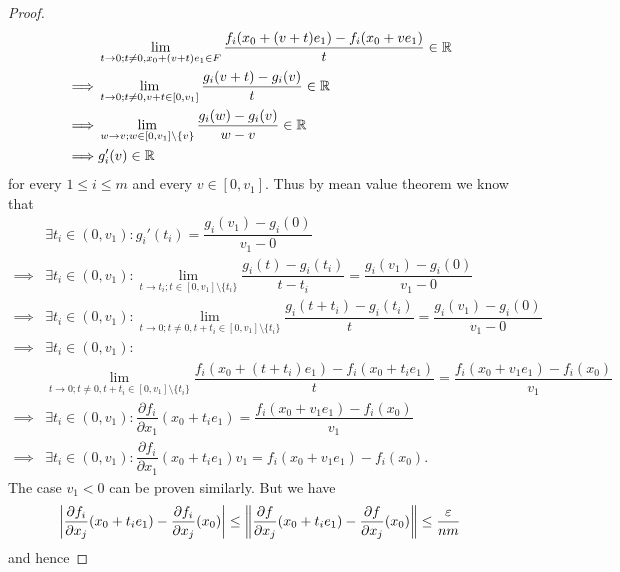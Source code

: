 \begin{proof}
\begin{align*}
             & \lim_{t \to 0 ; t \neq 0, x_0 + (v + t) e_1 \in F} \dfrac{f_i(x_0 + (v + t) e_1) - f_i(x_0 + v e_1)}{t} \in \R \\
    \implies & \lim_{t \to 0 ; t \neq 0, v + t \in [0, v_1]} \dfrac{g_i(v + t) - g_i(v)}{t} \in \R                            \\
    \implies & \lim_{w \to v ; w \in [0, v_1] \setminus \{v\}} \dfrac{g_i(w) - g_i(v)}{w - v} \in \R                          \\
    \implies & g_i'(v) \in \R
  \end{align*}
  for every \(1 \leq i \leq m\) and every \(v \in [0, v_1]\).
  Thus by mean value theorem we know that
  \begin{align*}
             & \exists t_i \in (0, v_1) : g_i'(t_i) = \dfrac{g_i(v_1) - g_i(0)}{v_1 - 0}                                                                                              \\
    \implies & \exists t_i \in (0, v_1) : \lim_{t \to t_i; t \in [0, v_1] \setminus \{t_i\}} \dfrac{g_i(t) - g_i(t_i)}{t - t_i} = \dfrac{g_i(v_1) - g_i(0)}{v_1 - 0}                  \\
    \implies & \exists t_i \in (0, v_1) : \lim_{t \to 0; t \neq 0, t + t_i \in [0, v_1] \setminus \{t_i\}} \dfrac{g_i(t + t_i) - g_i(t_i)}{t} = \dfrac{g_i(v_1) - g_i(0)}{v_1 - 0}    \\
    \implies & \exists t_i \in (0, v_1) :                                                                                                                                             \\
             & \lim_{t \to 0; t \neq 0, t + t_i \in [0, v_1] \setminus \{t_i\}} \dfrac{f_i(x_0 + (t + t_i) e_1) - f_i(x_0 + t_i e_1)}{t} = \dfrac{f_i(x_0 + v_1 e_1) - f_i(x_0)}{v_1} \\
    \implies & \exists t_i \in (0, v_1) : \dfrac{\partial f_i}{\partial x_1}(x_0 + t_i e_1) = \dfrac{f_i(x_0 + v_1 e_1) - f_i(x_0)}{v_1}                                              \\
    \implies & \exists t_i \in (0, v_1) : \dfrac{\partial f_i}{\partial x_1}(x_0 + t_i e_1) v_1 = f_i(x_0 + v_1 e_1) - f_i(x_0).
  \end{align*}
  The case \(v_1 < 0\) can be proven similarly.
  But we have
  \[
    \abs{\dfrac{\partial f_i}{\partial x_j}(x_0 + t_i e_1) - \dfrac{\partial f_i}{\partial x_j}(x_0)} \leq \norm*{\dfrac{\partial f}{\partial x_j}(x_0 + t_i e_1) - \dfrac{\partial f}{\partial x_j}(x_0)} \leq \dfrac{\varepsilon}{nm}
  \]
  and hence

\end{proof}
